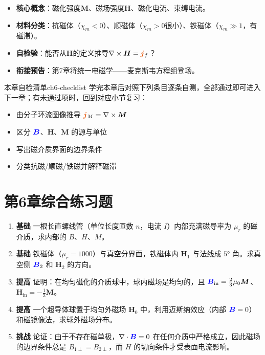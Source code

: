 \documentclass[11pt,a4paper,openany,oneside]{book}
\newcommand{\vecB}{\textcolor{blue}{\vect{B}}}
\newcommand{\vecJ}{\textcolor{cororange}{\vect{j}}}
\newcommand{\muz}{\mu_0}
\newcommand{\vect}[1]{\bm{#1}}
\newcommand{\curl}{\nabla\times}
\begin{document}
\begin{chapterreview}
\begin{itemize}[nosep]
\item \textbf{核心概念}：磁化强度$\vect{M}$、磁场强度$\vect{H}$、磁化电流、束缚电流。
\item \textbf{材料分类}：抗磁体（$\chi_m<0$）、顺磁体（$\chi_m>0$很小）、铁磁体（$\chi_m\gg 1$，有磁滞）。
\item \textbf{自检验}：能否从$\vect{H}$的定义推导$\curl\vect{H}=\vecJ_f$？
\item \textbf{衔接预告}：第7章将统一电磁学——麦克斯韦方程组登场。
\end{itemize}
\end{chapterreview}

\begin{tip}{本章自检清单}{ch6-checklist}
学完本章后对照下列条目逐条自测，全部通过即可进入下一章；有未通过项时，回到对应小节复习：
\begin{itemize}[label=$\square$, nosep]
\item 由分子环流图像推导 $\vecJ_M = \curl\vect{M}$
\item 区分 $\vecB$、$\vect{H}$、$\vect{M}$ 的源与单位
\item 写出磁介质界面的边界条件
\item 分类抗磁/顺磁/铁磁并解释磁滞
\end{itemize}
\end{tip}


\section*{第6章综合练习题}
\begin{enumerate}[label=\textbf{\arabic*.}]
\item \textbf{基础} 一根长直螺线管（单位长度匝数 $n$，电流 $I$）内部充满磁导率为 $\mu_r$ 的磁介质，求内部的 $B$、$H$、$M$。
\item \textbf{基础} 铁磁体（$\mu_r=1000$）与真空分界面，铁磁体内 $\vect{H}_1$ 与法线成 $5°$ 角。求真空侧 $\vecB_2$ 和 $\vect{H}_2$ 的方向。
\item \textbf{提高} 证明：在均匀磁化的介质球中，球内磁场是均匀的，且 $\vecB_{\text{in}}=\frac{2}{3}\muz\vect{M}$、$\vect{H}_{\text{in}}=-\frac{1}{3}\vect{M}$。
\item \textbf{提高} 一个超导体球置于均匀外磁场 $\vect{H}_0$ 中，利用迈斯纳效应（内部 $\vecB=0$）和磁镜像法，求球外磁场分布。
\item \textbf{挑战} 论证：由于不存在磁单极，$\nabla\cdot\vecB=0$ 在任何介质中严格成立，因此磁场的边界条件总是 $B_{1\perp}=B_{2\perp}$，而 $H$ 的切向条件才受表面电流影响。
\end{enumerate}
\newpage
\end{document}
